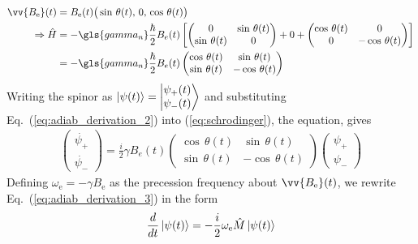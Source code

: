 \begin{align}
    \vv{B_\text{e}}(t) &= B_\text{e}(t)\big(\sin\,\theta(t),\,0,\,\cos\,\theta(t) \big) \\
    \Rightarrow \hat{H} &= -\gls{gamma_n}\frac{\hbar}{2}B_{e}(t)\left[\left(\begin{matrix}
                0 & \sin \, \theta(t)\\
                \sin \, \theta(t) & 0
                \end{matrix}\right)+0+\left(\begin{matrix}
                \cos \, \theta(t) & 0\\
                0 & -\cos \, \theta(t)
                \end{matrix}\right)\right] \nonumber \\
    &= -\gls{gamma_n} \frac{\hbar}{2}B_{e}(t)\left(\begin{matrix}
                \cos \, \theta(t) & \sin \, \theta(t)\\
                \sin \, \theta(t) & -\cos \, \theta(t)
                \end{matrix}\right) \label{eq:adiab_derivation_2}
\end{align}
%
Writing the spinor as
$\Ket{\psi(t)}=\Ket{\begin{matrix}
    \psi_{+}(t)\\
    \psi_{-}(t)
\end{matrix}}$ and substituting Eq.~(\ref{eq:adiab_derivation_2}) into (\ref{eq:schrodinger}), the \schrodinger equation, gives
%
\begin{gather}
    \left(\begin{matrix}
    \dot{\psi_{+}}\\
    \dot{\psi_{-}}
    \end{matrix}\right)=\frac{i}{2}\gamma B_{e}(t)\left(\begin{matrix}
    \cos\, \theta(t) & \sin\, \theta(t)\\
    \sin\, \theta(t) & -\cos\, \theta(t)
    \end{matrix}\right)\left(\begin{matrix}
    \psi_{+}\\
    \psi_{-}
    \end{matrix}\right) \label{eq:adiab_derivation_3}
\end{gather}
%
Defining $\omega_\text{e}=-\gamma B_\text{e}$ as the precession frequency about $\vv{B_\text{e}}(t)$, we rewrite Eq.~(\ref{eq:adiab_derivation_3}) in the form
%
\begin{gather}
    \frac{d}{dt}\Ket{\psi(t)}=-\frac{i}{2}\omega_\text{e}\hat{M}\Ket{\psi(t)}
    \label{eq:adiab_derivation_4}
\end{gather}
